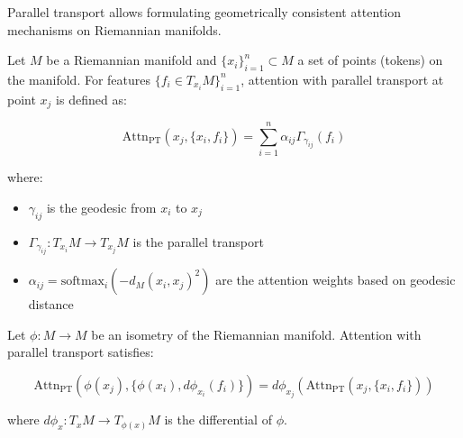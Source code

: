 Parallel transport allows formulating geometrically consistent attention mechanisms on Riemannian manifolds.

\begin{definition}\label{def:attention_parallel_transport}
Let $M$ be a Riemannian manifold and $\{x_i\}_{i=1}^n \subset M$ a set of points (tokens) on the manifold. For features $\{f_i \in T_{x_i}M\}_{i=1}^n$, attention with parallel transport at point $x_j$ is defined as:

\begin{equation}
\text{Attn}_{\text{PT}}(x_j, \{x_i, f_i\}) = \sum_{i=1}^n \alpha_{ij} \Gamma_{\gamma_{ij}}(f_i)
\label{eq:attention_parallel_transport}
\end{equation}

where:
\begin{itemize}
    \item $\gamma_{ij}$ is the geodesic from $x_i$ to $x_j$
    \item $\Gamma_{\gamma_{ij}}: T_{x_i}M \to T_{x_j}M$ is the parallel transport
    \item $\alpha_{ij} = \text{softmax}_i(-d_M(x_i, x_j)^2)$ are the attention weights based on geodesic distance
\end{itemize}
\end{definition}

\begin{theorem}\label{thm:attention_parallel_transport_equivariance}
Let $\phi: M \to M$ be an isometry of the Riemannian manifold. Attention with parallel transport satisfies:

\begin{equation}
\text{Attn}_{\text{PT}}(\phi(x_j), \{\phi(x_i), d\phi_{x_i}(f_i)\}) = d\phi_{x_j}(\text{Attn}_{\text{PT}}(x_j, \{x_i, f_i\}))
\end{equation}

where $d\phi_x: T_x M \to T_{\phi(x)}M$ is the differential of $\phi$.
\end{theorem}

